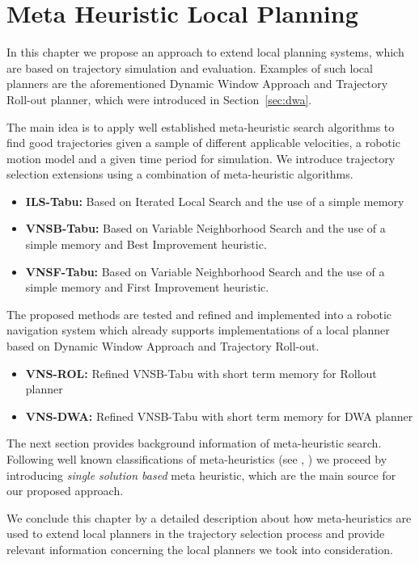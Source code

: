 \chapter{Meta Heuristic Local Planning}\label{ch:meta}

In this chapter we propose an approach to extend local planning systems, which are based on trajectory simulation and evaluation. Examples of such local planners are the aforementioned Dynamic Window Approach and Trajectory Roll-out planner, which were introduced in Section~\ref{sec:dwa}.

The main idea is to apply well established meta-heuristic search algorithms to find good trajectories given a sample of different applicable velocities, a robotic motion model and a given time period for simulation. We introduce trajectory selection extensions using a combination of meta-heuristic algorithms.

\begin{itemize}
\item{\bf{ILS-Tabu:}}  Based on Iterated Local Search and the use of a simple memory
\item{\bf{VNSB-Tabu:}} Based on Variable Neighborhood Search and the use of a simple memory and Best Improvement heuristic.
\item{\bf{VNSF-Tabu:}} Based on Variable Neighborhood Search and the use of a simple memory and First Improvement heuristic.
\end{itemize}

The proposed methods are tested and refined and implemented into a robotic navigation system which already supports implementations of a local planner based on Dynamic Window Approach and Trajectory Roll-out.

\begin{itemize}
\item{\bf{VNS-ROL:}} Refined VNSB-Tabu with short term memory for Rollout planner
\item{\bf{VNS-DWA:}} Refined VNSB-Tabu with short term memory for DWA planner
\end{itemize}

The next section provides background information of meta-heuristic search. Following well known classifications of meta-heuristics (see \cite{blum2003metaheuristics}, \cite{birattari2001classification} ) we proceed by introducing \emph{single solution based} meta heuristic, which are the main source for our proposed approach. 

We conclude this chapter by a detailed description about how meta-heuristics are used to extend local planners in the trajectory selection process and provide relevant information concerning the local planners we took into consideration. 

